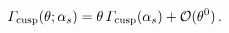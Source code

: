 \begin{equation}
{\mit\Gamma}_{\rm cusp} (\theta; \alpha_s) =
\theta \, {\mit\Gamma}_{\rm cusp} (\alpha_s) + \mathcal{O}(\theta^0)
\,.
\label{light-cusp}
\end{equation}

